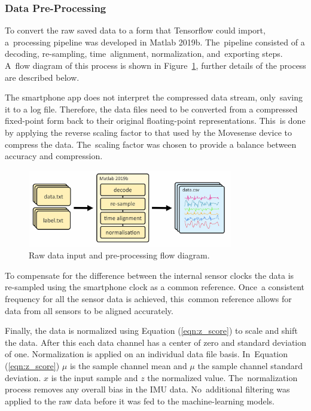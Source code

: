 \subsubsection{Data Pre-Processing}
\label{sec:pre-processing}
To convert the raw saved data to a form that Tensorflow could import, a~processing pipeline was developed in Matlab 2019b. The~pipeline consisted of a decoding, re-sampling, time~alignment, normalization, and~exporting steps. A~flow diagram of this process is shown in Figure~\ref{fig:data_processing}, further details of the process are described below.

The smartphone app does not interpret the compressed data stream, only~saving it to a log file. Therefore, the data files need to be converted from a compressed fixed-point form back to their original floating-point representations. This~is done by applying the reverse scaling factor to that used by the Movesense device to compress the data. The~scaling factor was chosen to provide a balance between accuracy and compression.

\begin{figure}[!hbt]
    \centering
    \includegraphics[width=0.8\textwidth]{content/4-LSTM_Behaviour/data_processing.jpg}
    \caption{Raw data input and pre-processing flow diagram.}
    \label{fig:data_processing}
\end{figure}


To compensate for the difference between the internal sensor clocks the data is re-sampled using the smartphone clock as a common reference. Once~a consistent frequency for all the sensor data is achieved, this~common reference allows for data from all sensors to be aligned accurately.

Finally, the data is normalized using Equation (\ref{eqn:z_score}) to scale and shift the data. After this each data channel has a center of zero and standard deviation of one. Normalization is applied on an individual data file basis. In~Equation (\ref{eqn:z_score}) $\mu$ is the sample channel mean and $\mu$ the sample channel standard deviation. $x$ is the input sample and $z$ the normalized value. The~normalization process removes any overall bias in the IMU data. No~additional filtering was applied to the raw data before it was fed to the machine-learning models.

